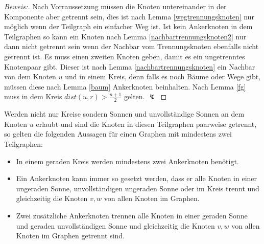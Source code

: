 \vspace{-3mm}
\begin{proof}[Beweis:]
Nach Vorraussetzung müssen die Knoten untereinander in der Komponente aber getrennt sein, dies ist nach Lemma \ref{wegtrennungsknoten} nur möglich wenn der Teilgraph ein einfacher Weg ist. Ist kein Ankerknoten in dem Teilgraphen so kann ein Knoten nach Lemma \ref{nachbartrennungsknoten2} nur dann nicht getrennt sein wenn der Nachbar vom Trennungsknoten ebenfalls nicht getrennt ist.  Es muss einen zweiten Knoten geben, damit es ein ungetrenntes Knotenpaar gibt. Dieser ist nach Lemma \ref{nachbartrennungsknoten} ein Nachbar von dem Knoten $u$ und in einem Kreis, denn falls es noch Bäume oder Wege gibt, müssen diese nach Lemma \ref{baum} Ankerknoten beinhalten. Nach Lemma \ref{fg} muss in dem Kreis $dist(u,r)>\frac{n+1}{2}$ gelten. $\lightning$
\end{proof}
\vspace{-2mm}
Werden nicht nur Kreise sondern Sonnen und unvollständige Sonnen an dem Knoten $u$ erlaubt und sind die Knoten in diesen Teilgraphen paarweise getrennt, so gelten die folgenden Aussagen für einen Graphen mit mindestens zwei Teilgraphen:\vspace{1mm}
\begin{lem}
\label{reihenfolge}
\begin{itemize}
\item In einem geraden Kreis werden mindestens zwei Ankerknoten benötigt. 
\item Ein Ankerknoten kann immer so gesetzt werden, dass er alle Knoten in einer ungeraden Sonne, unvollständigen ungeraden Sonne oder im Kreis trennt und gleichzeitig die Knoten $v,w$ von allen Knoten im Graphen.
\item Zwei zusätzliche Ankerknoten trennen alle Knoten in einer geraden Sonne und geraden unvollständigen Sonne und gleichzeitig die Knoten $v,w$ von allen Knoten im Graphen getrennt sind.
\end{itemize}
\end{lem}
\vspace{-2mm}
